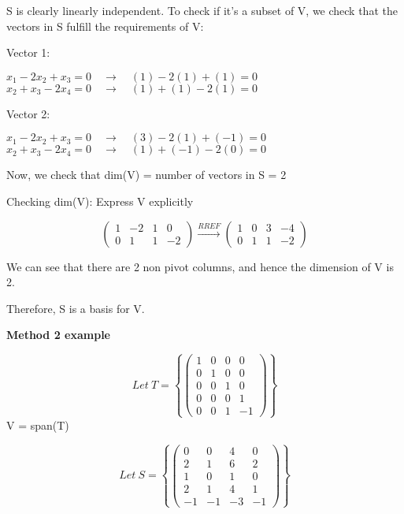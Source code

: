 \documentclass{article}
\newcommand{\sub}[1]{\vspace{10pt}\textbf{#1}}
\newcommand{\sbreak}{\vspace{10pt}}
\begin{document}
\sbreak

S is clearly linearly independent. To check if it's a subset of V, we check that the vectors in S fulfill the requirements of V:

Vector 1:
\begin{center}
    $x_1 - 2x_2 + x_3 = 0\quad \rightarrow \quad(1) - 2(1) + (1) = 0$
    $x_2 + x_3 - 2x_4 = 0\quad \rightarrow \quad(1) + (1) - 2(1) = 0$
\end{center}

Vector 2:
\begin{center}
    $x_1 - 2x_2 + x_3 = 0\quad \rightarrow \quad(3) - 2(1) + (-1) = 0$
    $x_2 + x_3 - 2x_4 = 0\quad \rightarrow \quad(1) + (-1) - 2(0) = 0$
\end{center}

\sbreak

Now, we check that dim(V) = number of vectors in S = 2

Checking dim(V):
Express V explicitly
\begin{center}
    \[
    \begin{pmatrix}
        1 & -2 & 1 & 0 \\
        0 & 1 & 1 & -2
    \end{pmatrix}
    \xrightarrow{RREF}
    \begin{pmatrix}
        1 & 0 & 3 & -4 \\
        0 & 1 & 1 & -2
    \end{pmatrix}
    \]
\end{center}

We can see that there are 2 non pivot columns, and hence the dimension of V is 2.

Therefore, S is a basis for V.

\sbreak

\sub{Method 2 example}

\[
    Let\ T = 
\left\{
\begin{pmatrix}
    1 & 0 & 0 & 0 \\
    0 & 1 & 0 & 0\\
    0 & 0 & 1 & 0\\
    0 & 0 & 0 & 1\\
    0 & 0 & 1 & -1
\end{pmatrix}
\right\}
\]
V = span(T)

\[
    Let\ S = 
\left\{
\begin{pmatrix}
    0 & 0 & 4 & 0 \\
    2 & 1 & 6 & 2\\
    1 & 0 & 1 & 0\\
    2 & 1 & 4 & 1\\
    -1 & -1 & -3 & -1
\end{pmatrix}
\right\}
\]
\end{document}
